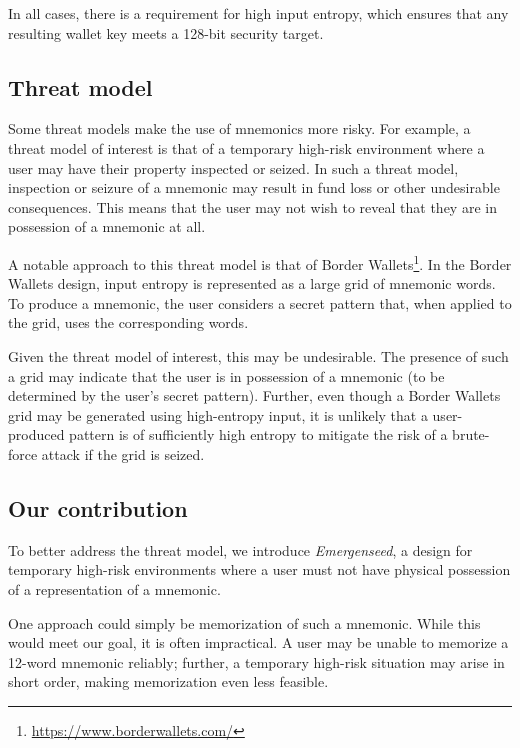 \documentclass{article}
\begin{document}
In all cases, there is a requirement for high input entropy, which ensures that any resulting wallet key meets a 128-bit security target.


\subsection{Threat model}

Some threat models make the use of mnemonics more risky.
For example, a threat model of interest is that of a temporary high-risk environment where a user may have their property inspected or seized.
In such a threat model, inspection or seizure of a mnemonic may result in fund loss or other undesirable consequences.
This means that the user may not wish to reveal that they are in possession of a mnemonic at all.

A notable approach to this threat model is that of Border Wallets\footnote{\url{https://www.borderwallets.com/}}.
In the Border Wallets design, input entropy is represented as a large grid of mnemonic words.
To produce a mnemonic, the user considers a secret pattern that, when applied to the grid, uses the corresponding words.

Given the threat model of interest, this may be undesirable.
The presence of such a grid may indicate that the user is in possession of a mnemonic (to be determined by the user's secret pattern).
Further, even though a Border Wallets grid may be generated using high-entropy input, it is unlikely that a user-produced pattern is of sufficiently high entropy to mitigate the risk of a brute-force attack if the grid is seized.


\subsection{Our contribution}

To better address the threat model, we introduce \textit{Emergenseed}, a design for temporary high-risk environments where a user must not have physical possession of a representation of a mnemonic.

One approach could simply be memorization of such a mnemonic.
While this would meet our goal, it is often impractical.
A user may be unable to memorize a 12-word mnemonic reliably; further, a temporary high-risk situation may arise in short order, making memorization even less feasible.
\end{document}
